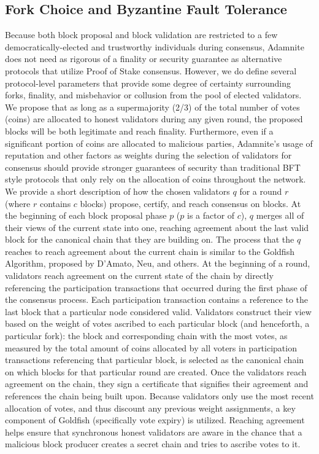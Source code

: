 \documentclass[conference]{IEEEtran}
\begin{document}
\subsection{Fork Choice and Byzantine Fault Tolerance}
Because both block proposal and block validation are restricted to a few democratically-elected and trustworthy individuals during consensus, Adamnite does not need as rigorous of a finality or security guarantee as alternative protocols that utilize Proof of Stake consensus. However, we do define several protocol-level parameters that provide some degree of certainty surrounding forks, finality, and misbehavior or collusion from the pool of elected validators. We propose that as long as a supermajority (2/3) of the total number of votes (coins) are allocated to honest validators during any given round, the proposed blocks will be both legitimate and reach finality. Furthermore, even if a significant portion of coins are allocated to malicious parties, Adamnite's usage of reputation and other factors as weights during the selection of validators for consensus should provide stronger guarantees of security than traditional BFT style protocols that only rely on the allocation of coins throughout the network.\\

We provide a short description of how the chosen validators $q$ for a round $r$ (where $r$ contains $c$ blocks) propose, certify, and reach consensus on blocks. At the beginning of each block proposal phase $p$ ($p$ is a factor of $c$), $q$ merges all of their views of the current state into one, reaching agreement about the last valid block for the canonical chain that they are building on. The process that the $q$ reaches to reach agreement about the current chain is similar to the Goldfish Algorithm, proposed by D'Amato, Neu, and others. At the beginning of a round, validators reach agreement on the current state of the chain by directly referencing the participation transactions that occurred during the first phase of the consensus process. Each participation transaction contains a reference to the last block that a particular node considered valid. Validators construct their view based on the weight of votes ascribed to each particular block (and henceforth, a particular fork): the block and corresponding chain with the most votes, as measured by the total amount of coins allocated by all voters in participation transactions referencing that particular block, is selected as the canonical chain on which blocks for that particular round are created. Once the validators reach agreement on the chain, they sign a certificate that signifies their agreement and references the chain being built upon. Because validators only use the most recent allocation of votes, and thus discount any previous weight assignments, a key component of Goldfish (specifically vote expiry) is utilized. Reaching agreement helps ensure that synchronous honest validators are aware in the chance that a malicious block producer creates a secret chain and tries to ascribe votes to it.\\
\end{document}
